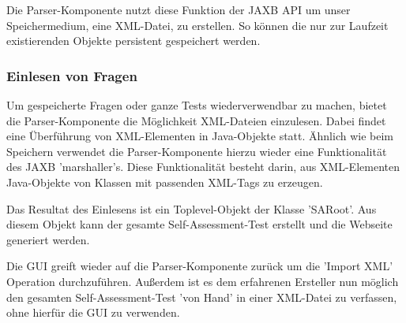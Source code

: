Die Parser-Komponente nutzt diese Funktion der JAXB API um unser Speichermedium, eine XML-Datei, zu erstellen.
So können die nur zur Laufzeit existierenden Objekte persistent gespeichert werden.

\subsubsection{Einlesen von Fragen}
Um gespeicherte Fragen oder ganze Tests wiederverwendbar zu machen, bietet die Parser-Komponente die Möglichkeit XML-Dateien einzulesen.
Dabei findet eine Überführung von XML-Elementen in Java-Objekte statt.
Ähnlich wie beim Speichern verwendet die Parser-Komponente hierzu wieder eine Funktionalität des JAXB 'marshaller's.
Diese Funktionalität besteht darin, aus XML-Elementen Java-Objekte von Klassen mit passenden XML-Tags zu erzeugen.

Das Resultat des Einlesens ist ein Toplevel-Objekt der Klasse 'SARoot'. 
Aus diesem Objekt kann der gesamte Self-Assessment-Test erstellt und die Webseite generiert werden. 

Die GUI greift wieder auf die Parser-Komponente zurück um die 'Import XML' Operation durchzuführen. 
Außerdem ist es dem erfahrenen Ersteller nun möglich den gesamten Self-Assessment-Test 'von Hand' in einer XML-Datei zu verfassen, ohne hierfür die GUI zu verwenden. 

